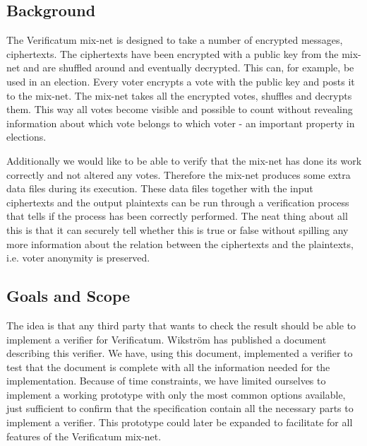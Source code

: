 \subsection{Background}

The Verificatum mix-net is designed to take a number of encrypted
messages, ciphertexts. The ciphertexts have been encrypted with a
public key from the mix-net and are shuffled around and eventually
decrypted. This can, for example, be used in an election. Every voter
encrypts a vote with the public key and posts it to the mix-net. The
mix-net takes all the encrypted votes, shuffles and decrypts
them. This way all votes become visible and possible to count without
revealing information about which vote belongs to which voter - 
an important property in elections.

Additionally we would like to be able to verify that the mix-net has
done its work correctly and not altered any votes. Therefore the
mix-net produces some extra data files during its execution. These
data files together with the input ciphertexts and the output
plaintexts can be run through a verification process that tells if the
process has been correctly performed. The neat thing about all this is
that it can securely tell whether this is true or false without
spilling any more information about the relation between the
ciphertexts and the plaintexts, i.e. voter anonymity is preserved.

\subsection{Goals and Scope}

The idea is that any third party that wants to check the result should
be able to implement a verifier for Verificatum. Wikström has
published a document describing this verifier. We have, using this
document, implemented a verifier to test that the document is complete
with all the information needed for the implementation. Because of
time constraints, we have limited ourselves to implement a working
prototype with only the most common options available, just sufficient
to confirm that the specification contain all the necessary parts to
implement a verifier. This prototype could later be expanded to
facilitate for all features of the Verificatum mix-net.
